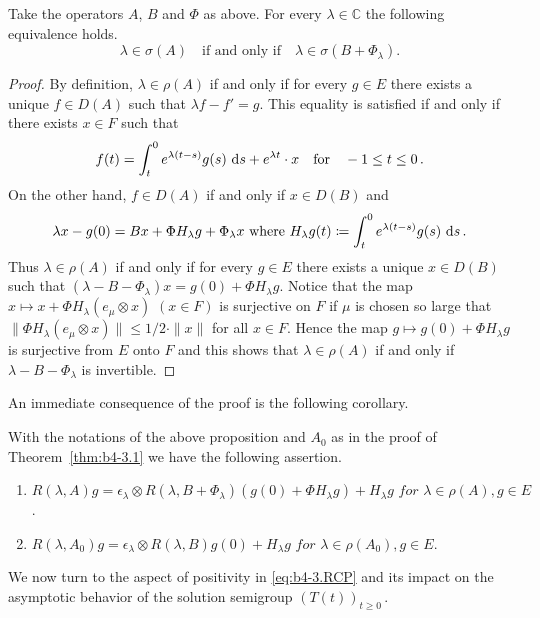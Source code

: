 \begin{proposition}\label{prop:b4-3.4}
	Take the operators $A$, $B$ and $\Phi$ as above. 
    For every $\lambda \in \mathbb{C}$ the following equivalence holds. 
	\begin{equation}\label{eq:b4-3.4}
		\lambda \in \sigma(A) \quad \text{if and only if} \quad \lambda \in \sigma(B + \Phi_\lambda).
	\end{equation}
\end{proposition}
\begin{proof} By definition, $\lambda \in \rho(A)$ if and only if for every $g \in E$ there exists a unique $f \in D(A)$ such that $\lambda f - f' = g$. 
This equality is satisfied if and only if there exists $x \in F$ such that
\[
f(t) = \int_t^0 e^{\lambda(t-s)} g(s) \,\mathop{}\!\mathrm{d}{s} + e^{\lambda t} \cdot x \quad \text{for} \quad -1 \leq t \leq 0  \,.
\]
On the other hand, $f \in D(A)$ if and only if $x \in D(B)$ and
\[
\text{$\lambda x - g(0) = Bx + \Phi H_\lambda g + \Phi_\lambda x$ where $H_\lambda g(t) \coloneq  \int_t^0 e^{\lambda(t-s)} g(s) \,\mathop{}\!\mathrm{d}{s}\,.$}
\]
Thus $\lambda \in \rho(A)$ if and only if for every $g \in E$ there exists a unique $x \in D(B)$ such that $(\lambda - B - \Phi_\lambda)x = g(0) + \Phi H_\lambda g$. 
Notice that the map $x \mapsto x + \Phi H_\lambda(e_\mu \otimes x)$ $(x \in F)$ is surjective on $F$ if $\mu$ is chosen so large that $\|\Phi H_\lambda(e_\mu \otimes x)\| \leq 1/2 \cdot \|x\|$ for all $x \in F$. 
Hence the map $g \mapsto g(0) + \Phi H_\lambda g$ is surjective from $E$ onto $F$ and this shows that $\lambda \in \rho(A)$ if and only if $\lambda - B - \Phi_\lambda$ is invertible.
\end{proof}
An immediate consequence of the proof is the following corollary.

\begin{corollary*}
With the notations of the above proposition and $A_{0}$ as in the proof of Theorem~\ref{thm:b4-3.1} we have the following assertion.
\begin{enumerate}
	\item  
	$R(\lambda,A)g = \epsilon_\lambda \otimes R(\lambda,B+\Phi_\lambda)(g(0)+\Phi H_\lambda g) + H_\lambda g \textit{ for } \lambda \in \rho(A), g \in E$.

	\item 
	$R(\lambda,A_{0})g = \epsilon_\lambda \otimes R(\lambda,B)g(0) + H_\lambda g \textit{ for }  \lambda \in \rho(A_{0}), g \in E$.
\end{enumerate}
\end{corollary*}
We now turn to the aspect of positivity in \eqref{eq:b4-3.RCP} and its impact on the asymptotic behavior of the solution semigroup $(T(t))_{t \geq 0}$\,.

